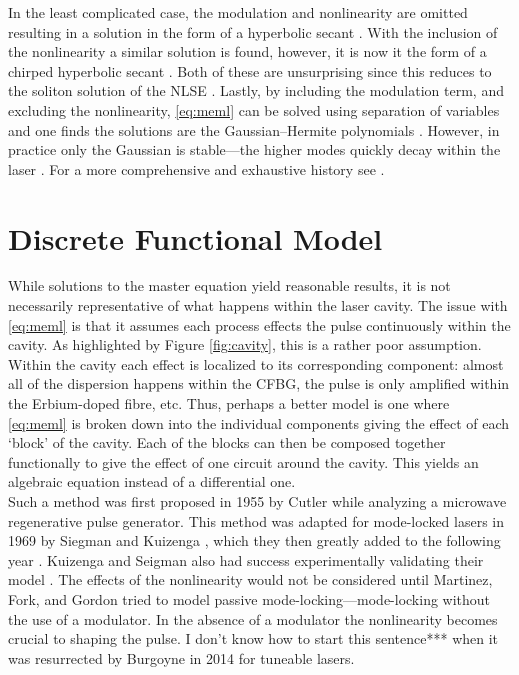 In the least complicated case, the modulation and nonlinearity are omitted resulting in a solution in the form of a hyperbolic secant \cite{haus1975, haus1986, haus1992}. With the inclusion of the nonlinearity a similar solution is found, however, it is now it the form of a chirped hyperbolic secant \cite{haus1991, usechak}. Both of these are unsurprising since this reduces to the soliton solution of the NLSE \cite{ferreira}. Lastly, by including the modulation term, and excluding the nonlinearity, \eqref{eq:meml} can be solved using separation of variables and one finds the solutions are the Gaussian--Hermite polynomials \cite{burgoyne2014, hausbook, haus1975, haus1996, haus2000, kartner, tamura, usechak}. However, in practice only the Gaussian is stable---the higher modes quickly decay within the laser \cite{hausbook, haus1975, haus1996, haus2000}. For a more comprehensive and exhaustive history see \cite{haus2000}. \\

\section{Discrete Functional Model}
While solutions to the master equation yield reasonable results, it is not necessarily representative of what happens within the laser cavity. The issue with \eqref{eq:meml} is that it assumes each process effects the pulse continuously within the cavity. As highlighted by Figure \ref{fig:cavity}, this is a rather poor assumption. Within the cavity each effect is localized to its corresponding component: almost all of the dispersion happens within the CFBG, the pulse is only amplified within the Erbium-doped fibre, etc. Thus, perhaps a better model is one where \eqref{eq:meml} is broken down into the individual components giving the effect of each `block' of the cavity. Each of the blocks can then be composed together functionally to give the effect of one circuit around the cavity. This yields an algebraic equation instead of a differential one. \\

Such a method was first proposed in 1955 by Cutler \cite{cutler} while analyzing a microwave regenerative pulse generator. This method was adapted for mode-locked lasers in 1969 by Siegman and Kuizenga \cite{seigman}, which they then greatly added to the following year \cite{kuizenga1970a}. Kuizenga and Seigman also had success experimentally validating their model \cite{kuizenga1970b, kuizenga1970}. The effects of the nonlinearity would not be considered until Martinez, Fork, and Gordon \cite{martinez1984, martinez1985} tried to model passive mode-locking---mode-locking without the use of a modulator. In the absence of a modulator the nonlinearity becomes crucial to shaping the pulse. I don't know how to start this sentence*** when it was resurrected by Burgoyne \cite{burgoyne2014} in 2014 for tuneable lasers. \\


